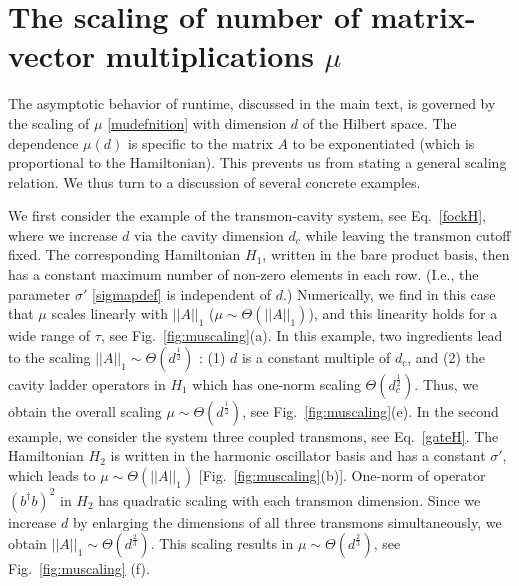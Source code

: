 \documentclass[12pt]{article}
\renewcommand{\norm}[1]{\left|\left|#1\right|\right|}
\begin{document}
\newpage
\clearpage

\appendix
\newpage

\section{The scaling of number of matrix-vector multiplications $\mu$}
\label{runtimescalingofUpsi}
The asymptotic behavior of runtime, discussed in the main text, is governed by the scaling of $\mu$ \eqref{mudefnition} with dimension $d$ of the Hilbert space. The dependence $\mu(d)$ is specific to the matrix $A$ to be exponentiated (which is proportional to the Hamiltonian). This prevents us from stating a general scaling relation. We thus turn to a discussion of several concrete examples. 

We first consider the example of the transmon-cavity system, see Eq.\ \eqref{fockH}, where we increase $d$ via the cavity dimension $d_c$ while leaving the transmon cutoff fixed. The corresponding Hamiltonian $H_1$, written in the bare product basis, then has a constant maximum number of non-zero elements in each row. (I.e., the parameter $\sigma'$ \eqref{sigmapdef} is independent of $d$.) Numerically, we find in this case that $\mu$ scales linearly with $\norm{A}_1$ \big($\mu\sim\Theta(\norm{A}_1)$\big), and this linearity holds for a wide range of $\tau$, see Fig.\ \ref{fig:muscaling}(a). In this example, two ingredients lead to the scaling $\norm{A}_1\sim \Theta(d^{\frac{1}{2}})$ : (1) $d$ is a constant multiple of $d_c$, and (2) the cavity ladder operators in $H_1$ which has one-norm scaling $\Theta(d_c^\frac{1}{2})$. Thus, we obtain the overall scaling $\mu\sim \Theta(d^{\frac{1}{2}})$, see Fig.\ \ref{fig:muscaling}(e). In the second example, we consider the system three coupled transmons, see Eq.\ \eqref{gateH}. The Hamiltonian $H_2$ is written in the harmonic oscillator basis and has a constant $\sigma'$, which leads to $\mu\sim\Theta(\norm{A}_1)$ [Fig.\ \ref{fig:muscaling}(b)]. One-norm of operator $(b^\dagger b)^2$ in $H_2$ has quadratic scaling with each transmon dimension. Since we increase $d$ by enlarging the dimensions of all three transmons simultaneously, we obtain $\norm{A}_1\sim\Theta(d^{\frac{2}{3}})$. This scaling results in $\mu\sim \Theta(d^{\frac{2}{3}})$, see Fig.\ \ref{fig:muscaling} (f).
\end{document}
